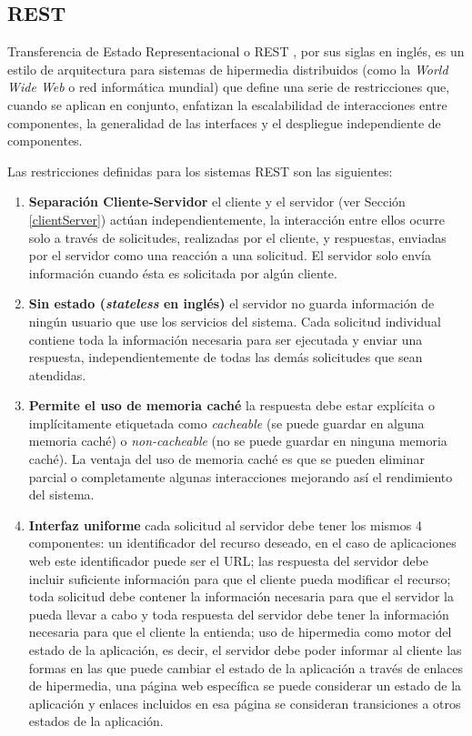     \subsection{REST}
    Transferencia de Estado Representacional o REST \cite{restFielding}, por sus siglas en inglés, es un estilo de arquitectura para sistemas de hipermedia distribuidos (como la \textit{World Wide Web} o red informática mundial) que define una serie de restricciones que, cuando se aplican en conjunto, enfatizan la escalabilidad de interacciones entre componentes, la generalidad de las interfaces y el despliegue independiente de componentes.

    Las restricciones definidas para los sistemas REST son las siguientes:

    \begin{enumerate}
        \item \textbf{Separación Cliente-Servidor} el cliente y el servidor (ver Sección \ref{clientServer}) actúan independientemente, la interacción entre ellos ocurre solo a través de solicitudes, realizadas por el cliente, y respuestas, enviadas por el servidor como una reacción a una solicitud. El servidor solo envía información cuando ésta es solicitada por algún cliente.
        \item \textbf{Sin estado (\emph{stateless} en inglés)} el servidor no guarda información de ningún usuario que use los servicios del sistema. Cada solicitud individual contiene toda la información necesaria para ser ejecutada y enviar una respuesta, independientemente de todas las demás solicitudes que sean atendidas.
        \item \textbf{Permite el uso de memoria caché} la respuesta debe estar explícita o implícitamente etiquetada como \textit{cacheable} (se puede guardar en alguna memoria caché) o \textit{non-cacheable} (no se puede guardar en ninguna memoria caché). La ventaja del uso de memoria caché es que se pueden eliminar parcial o completamente algunas interacciones mejorando así el rendimiento del sistema.
        \item \textbf{Interfaz uniforme} cada solicitud al servidor debe tener los mismos 4 componentes: un identificador del recurso deseado, en el caso de aplicaciones web este identificador puede ser el URL; las respuesta del servidor debe incluir suficiente información para que el cliente pueda modificar el recurso; toda solicitud debe contener la información necesaria para que el servidor la pueda llevar a cabo y toda respuesta del servidor debe tener la información necesaria para que el cliente la entienda; uso de hipermedia como motor del estado de la aplicación, es decir, el servidor debe poder informar al cliente las formas en las que puede cambiar el estado de la aplicación a través de enlaces de hipermedia, una página web específica se puede considerar un estado de la aplicación y enlaces incluidos en esa página se consideran transiciones a otros estados de la aplicación.

\end{enumerate}
